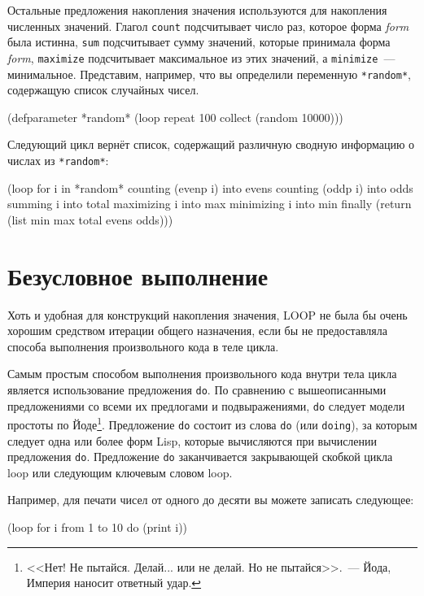 Остальные предложения накопления значения используются для накопления численных
значений. Глагол \lstinline{count} подсчитывает число раз, которое форма \textit{form} была
истинна, \lstinline{sum} подсчитывает сумму значений, которые принимала форма \textit{form},
\lstinline{maximize} подсчитывает максимальное из этих значений, а \lstinline{minimize}~---
минимальное. Представим, например, что вы определили переменную \lstinline{*random*},
содержащую список случайных чисел.

\begin{myverb}
(defparameter *random* (loop repeat 100 collect (random 10000)))
\end{myverb}

Следующий цикл вернёт список, содержащий различную сводную информацию о числах из
\lstinline{*random*}:

\begin{myverb}
(loop for i in *random*
   counting (evenp i) into evens
   counting (oddp i) into odds
   summing i into total
   maximizing i into max
   minimizing i into min
   finally (return (list min max total evens odds)))
\end{myverb}

\section{Безусловное выполнение}

Хоть и удобная для конструкций накопления значения, LOOP не была бы очень хорошим
средством итерации общего назначения, если бы не предоставляла способа выполнения
произвольного кода в теле цикла.

Самым простым способом выполнения произвольного кода внутри тела цикла является
использование предложения \lstinline{do}. По сравнению с вышеописанными предложениями со всеми
их предлогами и подвыражениями, \lstinline{do} следует модели простоты по Йоде\footnote{<<Нет!
  Не пытайся. Делай... или не делай. Но не пытайся>>.~--- Йода, Империя наносит ответный
  удар.}. Предложение \lstinline{do} состоит из слова \lstinline{do} (или \lstinline{doing}), за которым
следует одна или более форм Lisp, которые вычисляются при вычислении предложения
\lstinline{do}. Предложение \lstinline{do} заканчивается закрывающей скобкой цикла loop или
следующим ключевым словом loop.

Например, для печати чисел от одного до десяти вы можете записать следующее:

\begin{myverb}
(loop for i from 1 to 10 do (print i))
\end{myverb}

